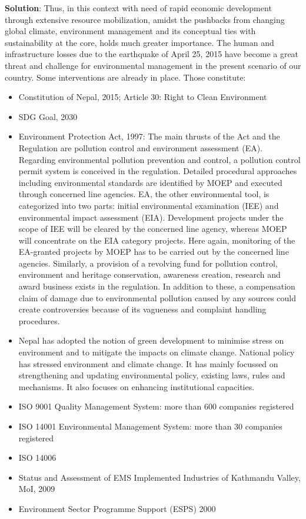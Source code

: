 \documentclass[
]{book}
\newenvironment{solution}{ {\bfseries Solution}:}{}
\begin{document}
\begin{questions}
\begin{solution}
Thus, in this context with need of rapid economic development through extensive resource mobilization, amidst the pushbacks from changing global climate, environment management and its conceptual ties with sustainability at the core, holds much greater importance. The human and infrastructure losses due to the earthquake of April 25, 2015 have become a great threat and challenge for environmental management in the present scenario of our country. Some interventions are already in place. Those constitute:

\begin{itemize}
\item Constitution of Nepal, 2015; Article 30: Right to Clean Environment
\item SDG Goal, 2030
\item Environment Protection Act, 1997: The main thrusts of the Act and the Regulation are pollution control and environment assessment (EA). Regarding environmental pollution prevention and control, a pollution control permit system is conceived in the regulation. Detailed procedural approaches including environmental standards are identified by MOEP and executed through concerned line agencies. EA, the other environmental tool, is categorized into two parts: initial environmental examination (IEE) and environmental impact assessment (EIA). Development projects under the scope of IEE will be cleared by the concerned line agency, whereas MOEP will concentrate on the EIA category projects. Here again, monitoring of the EA-granted projects by MOEP has to be carried out by the concerned line agencies. Similarly, a provision of a revolving fund for pollution control, environment and heritage conservation, awareness creation, research and award business exists in the regulation. In addition to these, a compensation claim of damage due to environmental pollution caused by any sources could create controversies because of its vagueness and complaint handling procedures.
\item Nepal has adopted the notion of green development to minimise stress on environment and to mitigate the impacts on climate change. National policy has stressed environment and climate change. It has mainly focussed on strengthening and updating environmental policy, existing laws, rules and mechanisms. It also focuses on enhancing institutional capacities.
\item ISO 9001 Quality Management System: more than 600 companies registered
\item ISO 14001 Environmental Management System: more than 30 companies registered
\item ISO 14006
\item Status and Assessment of EMS Implemented Industries of Kathmandu Valley, MoI, 2009 
\item Environment Sector Programme Support (ESPS) 2000
\end{itemize}


\end{solution}
\end{questions}
\end{document}
